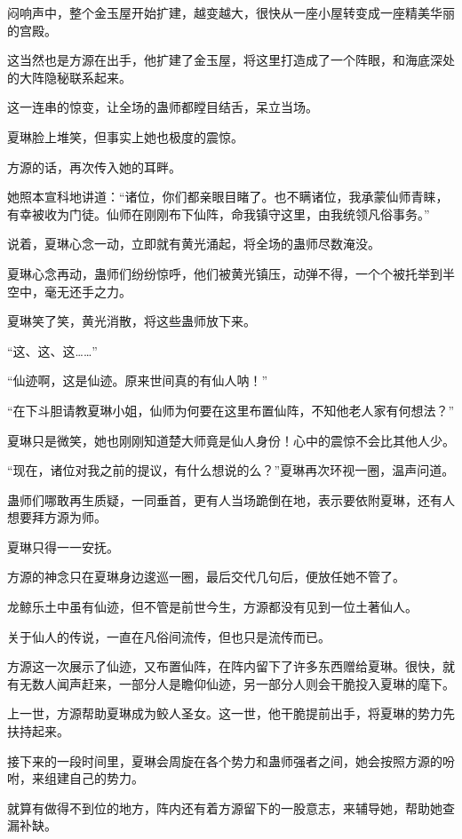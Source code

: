 \begin{this_body}
闷响声中，整个金玉屋开始扩建，越变越大，很快从一座小屋转变成一座精美华丽的宫殿。

这当然也是方源在出手，他扩建了金玉屋，将这里打造成了一个阵眼，和海底深处的大阵隐秘联系起来。

这一连串的惊变，让全场的蛊师都瞠目结舌，呆立当场。

夏琳脸上堆笑，但事实上她也极度的震惊。

方源的话，再次传入她的耳畔。

她照本宣科地讲道：“诸位，你们都亲眼目睹了。也不瞒诸位，我承蒙仙师青睐，有幸被收为门徒。仙师在刚刚布下仙阵，命我镇守这里，由我统领凡俗事务。”

说着，夏琳心念一动，立即就有黄光涌起，将全场的蛊师尽数淹没。

夏琳心念再动，蛊师们纷纷惊呼，他们被黄光镇压，动弹不得，一个个被托举到半空中，毫无还手之力。

夏琳笑了笑，黄光消散，将这些蛊师放下来。

“这、这、这……”

“仙迹啊，这是仙迹。原来世间真的有仙人呐！”

“在下斗胆请教夏琳小姐，仙师为何要在这里布置仙阵，不知他老人家有何想法？”

夏琳只是微笑，她也刚刚知道楚大师竟是仙人身份！心中的震惊不会比其他人少。

“现在，诸位对我之前的提议，有什么想说的么？”夏琳再次环视一圈，温声问道。

蛊师们哪敢再生质疑，一同垂首，更有人当场跪倒在地，表示要依附夏琳，还有人想要拜方源为师。

夏琳只得一一安抚。

方源的神念只在夏琳身边逡巡一圈，最后交代几句后，便放任她不管了。

龙鲸乐土中虽有仙迹，但不管是前世今生，方源都没有见到一位土著仙人。

关于仙人的传说，一直在凡俗间流传，但也只是流传而已。

方源这一次展示了仙迹，又布置仙阵，在阵内留下了许多东西赠给夏琳。很快，就有无数人闻声赶来，一部分人是瞻仰仙迹，另一部分人则会干脆投入夏琳的麾下。

上一世，方源帮助夏琳成为鲛人圣女。这一世，他干脆提前出手，将夏琳的势力先扶持起来。

接下来的一段时间里，夏琳会周旋在各个势力和蛊师强者之间，她会按照方源的吩咐，来组建自己的势力。

就算有做得不到位的地方，阵内还有着方源留下的一股意志，来辅导她，帮助她查漏补缺。


\end{this_body}
